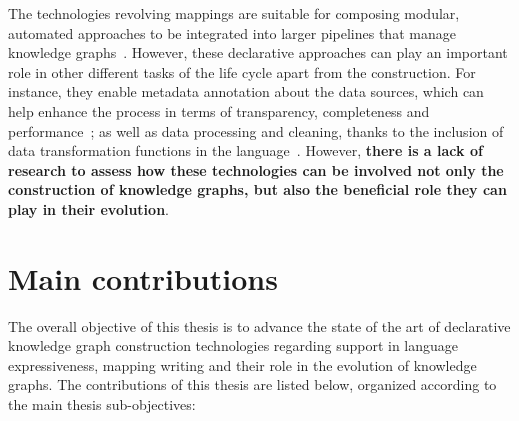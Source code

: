 
The technologies revolving mappings are suitable for composing modular, automated approaches to be integrated into larger pipelines that manage knowledge graphs~\parencite{simsek2021knowledge,cimmino2022helio,grassi2023composable}. 
However, these declarative approaches can play an important role in other different tasks of the life cycle apart from the construction. 
For instance, they enable metadata annotation about the data sources, which can help enhance the process in terms of transparency, completeness and performance~\parencite{chaves2021morph-csv,vidal2023knowledge}; as well as 
data processing and cleaning, thanks to the inclusion of data transformation functions in the language~\parencite{debruyne2016r2rmlf,junior2016funul,jozashoori2020funmap,DeMeester2017fno_dbpedia}.
However, \textbf{ there is a lack of research to assess how these technologies can be involved not only the construction of knowledge graphs, but also the beneficial role they can play in their evolution}.




\section{Main contributions}

The overall objective of this thesis is to advance the state of the art of declarative knowledge graph construction technologies regarding support in language expressiveness, mapping writing and their role in the evolution of knowledge graphs. The contributions of this thesis are listed below, organized according to the main thesis sub-objectives:

